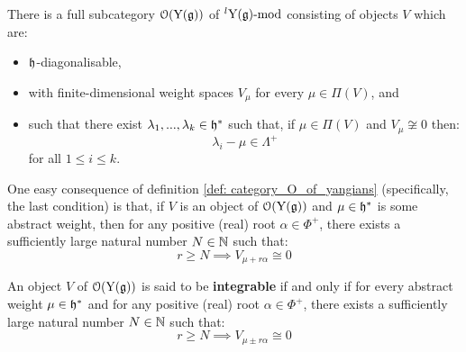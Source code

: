         \begin{definition} \label{def: category_O_of_yangians}
            There is a full subcategory $\mathcal{O}(\mathrm{Y}(\mathfrak{g}))$ of ${}^l\mathrm{Y}(\mathfrak{g})\text{-}\mathrm{mod}$ consisting of objects $V$ which are:
            \begin{itemize}
                \item $\mathfrak{h}$-diagonalisable,
                \item with finite-dimensional weight spaces $V_{\mu}$ for every $\mu \in \Pi(V)$, and
                \item such that there exist $\lambda_1, ..., \lambda_k \in \mathfrak{h}^*$ such that, if $\mu \in \Pi(V)$ and $V_{\mu} \not \cong 0$ then:
                    $$\lambda_i - \mu \in \Lambda^+$$
                for all $1 \leq i \leq k$.
            \end{itemize}
        \end{definition}
        \begin{remark}
            One easy consequence of definition \ref{def: category_O_of_yangians} (specifically, the last condition) is that, if $V$ is an object of $\mathcal{O}(\mathrm{Y}(\mathfrak{g}))$ and $\mu \in \mathfrak{h}^*$ is some abstract weight, then for any positive (real) root $\alpha \in \Phi^+$, there exists a sufficiently large natural number $N \in \mathbb{N}$ such that:
                $$r \geq N \implies V_{\mu + r \alpha} \cong 0$$
        \end{remark}
        \begin{definition} \label{def: integrable_modules_over_yangians}
            An object $V$ of $\mathcal{O}(\mathrm{Y}(\mathfrak{g}))$ is said to be \textbf{integrable} if and only if for every abstract weight $\mu \in \mathfrak{h}^*$ and for any positive (real) root $\alpha \in \Phi^+$, there exists a sufficiently large natural number $N \in \mathbb{N}$ such that:
                $$r \geq N \implies V_{\mu \pm r \alpha} \cong 0$$
        \end{definition}


